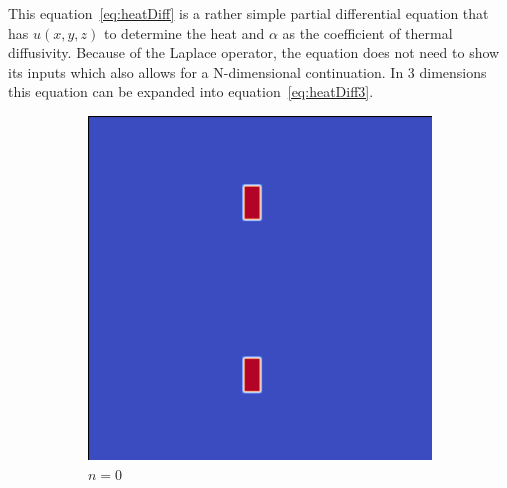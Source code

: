 \documentclass[12pt, letterpaper]{article}
\begin{document}
This equation~\ref{eq:heatDiff} is a rather simple partial differential equation that has $u(x, y, z)$ 
to determine the heat and $\alpha$ as the coefficient of thermal diffusivity. Because of the Laplace
operator, the equation does not need to show its inputs which also allows for a N-dimensional continuation.
In 3 dimensions this equation can be expanded into equation~\ref{eq:heatDiff3}.

\begin{figure}[h]
\label{fig:progression}
  \centering
  \caption{Heat Diffusion Progression}
  \begin{subfigure}[b]{.21\linewidth}
    \includegraphics[width=\linewidth]{HeatProgression/diffusion0}
    \caption{$n=0$}
  \end{subfigure}
  \begin{subfigure}[b]{.21\linewidth}

\end{subfigure}
\end{figure}
\end{document}
